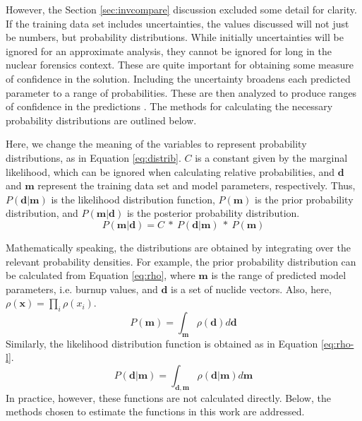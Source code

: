 However, the Section \ref{sec:invcompare} discussion excluded some detail for
clarity. If the training data set includes uncertainties, the values discussed
will not just be numbers, but probability distributions.  While initially
uncertainties will be ignored for an approximate analysis, they cannot be
ignored for long in the nuclear forensics context. These are quite important
for obtaining some measure of confidence in the solution.  Including the
uncertainty broadens each predicted parameter to a range of probabilities.
These are then analyzed to produce ranges of confidence in the predictions
\cite{bayes_compare}.  The methods for calculating the necessary probability
distributions are outlined below.

Here, we change the meaning of the variables to represent probability
distributions, as in Equation \ref{eq:distrib}.  $C$ is a constant given by the
marginal likelihood, which can be ignored when calculating relative
probabilities, and $\boldsymbol{d}$ and $\boldsymbol{m}$ represent the training
data set and model parameters, respectively. Thus,
$P(\boldsymbol{d}|\boldsymbol{m})$ is the likelihood distribution function,
$P(\boldsymbol{m})$ is the prior probability distribution, and
$P(\boldsymbol{m}|\boldsymbol{d})$ is the posterior probability distribution.
\begin{equation}
\label{eq:distrib}
  P(\boldsymbol{m}|\boldsymbol{d}) = C\ *\
  P(\boldsymbol{d}|\boldsymbol{m})\ *\ P(\boldsymbol{m})
\end{equation}

Mathematically speaking, the distributions are obtained by integrating over the
relevant probability densities.  For example, the prior probability
distribution can be calculated from Equation \ref{eq:rho}, where
$\boldsymbol{m}$ is the range of predicted model parameters, i.e. burnup
values, and $\boldsymbol{d}$ is a set of nuclide vectors. Also, here,
$\rho(\boldsymbol{x}) = \prod_{i} \rho(x_i)$. 
\begin{equation}
\label{eq:rho}
  P(\boldsymbol{m}) = \int_{\boldsymbol{m}} \rho(\boldsymbol{d}) d\boldsymbol{d}
\end{equation}
Similarly, the likelihood distribution function is obtained as in Equation 
\ref{eq:rho-l}.
\begin{equation}
\label{eq:rho-l}
  P(\boldsymbol{d}|\boldsymbol{m}) = \int_{\boldsymbol{d}, \boldsymbol{m}} \rho(\boldsymbol{d}|\boldsymbol{m}) d\boldsymbol{m}
\end{equation}
In practice, however, these functions are not calculated directly. Below, the
methods chosen to estimate the functions in this work are addressed.

